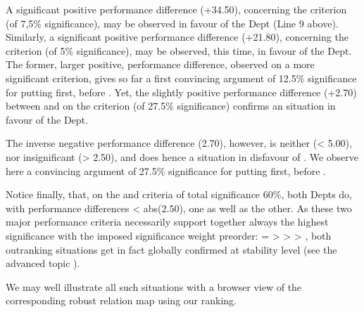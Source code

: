 \documentclass[a4paper,12pt,english]{sphinxhowto}
\begin{document}
A significant positive performance difference (+34.50), concerning the  criterion (of 7,5\% significance), may be observed in favour of the  Dept (Line 9 above). Similarly, a significant positive performance difference (+21.80), concerning the  criterion (of 5\% significance), may be observed, this time, in favour of the  Dept. The former, larger positive, performance difference, observed on a more significant criterion, gives so far a first convincing argument of 12.5\% significance for putting  first, before . Yet, the slightly positive performance difference (+2.70) between  and  on the  criterion (of 27.5\% significance) confirms an  situation in favour of the  Dept.

The inverse negative performance difference (\sphinxhyphen{}2.70), however, is neither  (\textless{} \sphinxhyphen{}5.00), nor insignificant (\textgreater{} \sphinxhyphen{}2.50), and does hence  a  situation in disfavour of . We observe here a convincing argument of 27.5\% significance for putting  first, before .

Notice finally, that, on the  and  criteria of total significance 60\%, both Depts do, with performance differences \textless{} abs(2.50), one as well as the other. As these two major performance criteria necessarily support together always the highest significance with the imposed significance weight preorder:  =  \textgreater{}  \textgreater{}  \textgreater{} , both outranking situations get in fact globally confirmed at stability level  (see the advanced topic ).

We may well illustrate all such  situations with a browser view of the corresponding robust relation map using our  ranking.
\end{document}
